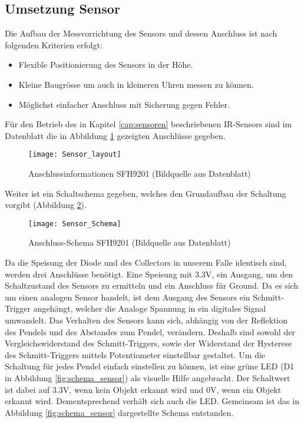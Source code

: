 \subsection{Umsetzung Sensor}
\label{cap:umsetzung_sensor}
	Die Aufbau der Messvorrichtung des Sensors und dessen Anschluss ist nach folgenden Kriterien erfolgt:
	\begin{itemize}
		\item Flexible Positionierung des Sensors in der Höhe.
		\item Kleine Baugrösse um auch in kleineren Uhren messen zu können.
		\item Möglichst einfacher Anschluss mit Sicherung gegen Fehler.
	\end{itemize}
	Für den Betrieb des in Kapitel \ref{cap:sensoren} beschriebenen IR-Sensors sind im Datenblatt die in Abbildung \ref{fig:info_SFH9201} gezeigten Anschlüsse gegeben.
	\begin{figure}[H]
		\centering
		\texttt{[image: Sensor\_layout]}
		\caption{Anschlussinformationen SFH9201 (Bildquelle aus Datenblatt)}
		\label{fig:info_SFH9201}
	\end{figure}
	Weiter ist ein Schaltschema gegeben, welches den Grundaufbau der Schaltung vorgibt (Abbildung \ref{fig:schema_SFH9201}).
	\begin{figure}[H]
		\centering
		\texttt{[image: Sensor\_Schema]}
		\caption{Anschluss-Schema SFH9201 (Bildquelle aus Datenblatt)}
		\label{fig:schema_SFH9201}
	\end{figure}
	\noindent Da die Speisung der Diode und des Collectors in unserem Falle identisch sind, werden drei Anschlüsse benötigt. Eine Speisung mit 3.3V, ein Ausgang, um den Schaltzustand des Sensors zu ermitteln und ein Anschluss für Ground. 
Da es sich um einen analogen Sensor handelt, ist dem Ausgang des Sensors ein Schmitt-Trigger angehängt, welcher die Analoge Spannung in ein digitales Signal umwandelt. 
Das Verhalten des Sensors kann sich, abhängig von der Reflektion des Pendels und des Abstandes zum Pendel, verändern. Deshalb sind sowohl der Vergleichswiderstand des Schmitt-Triggers, sowie der Widerstand der Hysterese des Schmitt-Triggers mittels Potentiometer einstellbar gestaltet. 
Um die Schaltung für jedes Pendel einfach einstellen zu können, ist eine grüne LED (D1 in Abbildung \ref{fig:schema_sensor}) als visuelle Hilfe angebracht. Der Schaltwert ist dabei auf 3.3V, wenn kein Objekt erkannt wird und 0V, wenn ein Objekt erkannt wird. Dementsprechend verhält sich auch die LED. Gemeinsam ist das in Abbildung \ref{fig:schema_sensor} dargestellte Schema entstanden.
